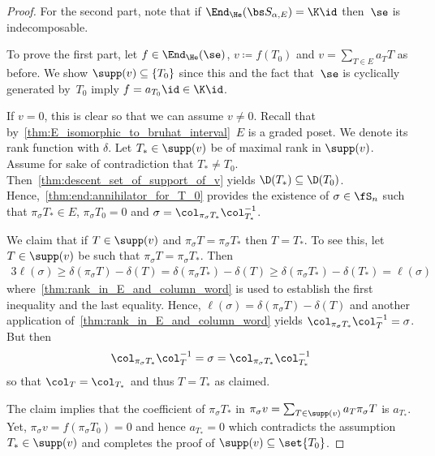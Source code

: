 \begin{proof} 
	For the second part, note that if $\End_{\He}(\bs S_{\alpha,E})=\K \id$ then~$\se$ is indecomposable. 
		
	To prove the first part, let $f\in \End_{\He}(\se)$, $v\coloneqq f(T_0)$ and $v = \sum_{T\in E} a_T T$ as before.
	We show $\supp(v) \subseteq \{T_0\}$ since this and the fact that~$\se$ is cyclically generated by~$T_0$ imply $f = a_{T_0}\id\in \K \id$.
	
		
	If $v=0$, this is clear so that we can assume $v\neq 0$. Recall that by~\cref{thm:E_isomorphic_to_bruhat_interval}~$E$ is a graded poset. We denote its rank function with $\delta$.
	Let $T_*\in \supp(v)$ be of maximal rank in $\supp(v)$. Assume for sake of contradiction that $T_* \neq T_0$. Then~\cref{thm:descent_set_of_support_of_v} yields $\D(T_*) \subseteq \D(T_0)$. Hence,~\cref{thm:end:annihilator_for_T_0} provides the existence of $\sigma \in \fS_n$ such that $\pi_\sigma T_*\in E$, $\pi_\sigma T_0 = 0$ and $\sigma = \col_{\pi_\sigma T_*}\col_{T_*}^{-1}$.
	
	We claim that if $T\in \supp(v)$ and $\pi_\sigma T = \pi_\sigma T_*$ then $T = T_*$.
	To see this, let $T\in \supp(v)$ be such that $\pi_\sigma T = \pi_\sigma T_*$. Then
		\begin{alignat*}{3}
			\ell(\sigma) 
			\geq \delta(\pi_\sigma T) - \delta(T)
			= \delta(\pi_\sigma T_*) - \delta(T) 
			\geq \delta(\pi_\sigma T_*) - \delta(T_*) 
			= \ell(\sigma)
		\end{alignat*}
		where~\cref{thm:rank_in_E_and_column_word} is used to establish the first inequality and the last equality. Hence, 	$\ell(\sigma)= \delta(\pi_\sigma T) - \delta(T)$ and another application of~\cref{thm:rank_in_E_and_column_word} yields $\col_{\pi_\sigma T_*}\col^{-1}_{T} = \sigma$. But then
		\begin{align*}
		\col_{\pi_\sigma T_*}\col^{-1}_{T} = \sigma= \col_{\pi_\sigma T_*}\col_{T_*}^{-1}
		\end{align*}
		 so that $\col_T = \col_{T_*}$ and thus $T = T_*$ as claimed.
		
	The claim implies that the coefficient of $\pi_\sigma T_*$ in $\pi_\sigma v = \sum_{T \in \supp(v)} a_T \pi_\sigma T$ is $a_{T_*}$.	
	Yet, $\pi_\sigma v = f(\pi_\sigma T_0) = 0$ and hence $a_{T_*} = 0$ which contradicts the assumption $T_* \in \supp(v)$ and completes the proof of $\supp(v) \subseteq \set{T_0}$.
\end{proof}
